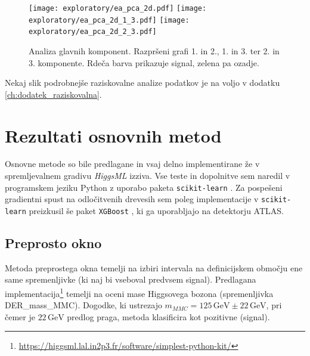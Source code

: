 \documentclass[11pt,a4paper,openany]{book}
\begin{document}
\begin{figure}[ht!]	
	\texttt{[image: exploratory/ea\_pca\_2d.pdf]}
	\texttt{[image: exploratory/ea\_pca\_2d\_1\_3.pdf]}
	\texttt{[image: exploratory/ea\_pca\_2d\_2\_3.pdf]}		
	
	\caption{Analiza glavnih komponent. Razpršeni grafi 1. in 2., 1. in 3. ter 2. in 3. komponente. Rdeča barva prikazuje signal, zelena pa ozadje.}
	\label{sl:pca}
\end{figure}

\noindent Nekaj slik podrobnejše raziskovalne analize podatkov je na voljo v dodatku \ref{ch:dodatek_raziskovalna}.

	
\chapter{Rezultati osnovnih metod}

Osnovne metode so bile predlagane in vsaj delno implementirane že v spremljevalnem gradivu \textit{HiggsML} izziva. Vse teste in dopolnitve sem naredil v programskem jeziku Python z uporabo paketa \texttt{scikit-learn} \cite{scikit-learn}. Za pospešeni gradientni spust na odločitvenih drevesih sem poleg implementacije v \texttt{scikit-learn} preizkusil še paket \texttt{XGBoost} \cite{chen2014}, ki ga uporabljajo na detektorju ATLAS.

	
\section{Preprosto okno}

Metoda preprostega okna temelji na izbiri intervala na definicijskem območju ene same spremenljivke (ki naj bi vseboval predvsem signal). Predlagana implementacija\footnote{\url{https://higgsml.lal.in2p3.fr/software/simplest-python-kit/}} temelji na oceni mase Higgsovega bozona (spremenljivka DER\_mass\_MMC). Dogodke, ki ustrezajo $m_{MMC} = 125\,\text{GeV} \pm 22\,\text{GeV}$, pri čemer je $22\,\text{GeV}$ predlog praga, metoda klasificira kot pozitivne (signal).
\end{document}
